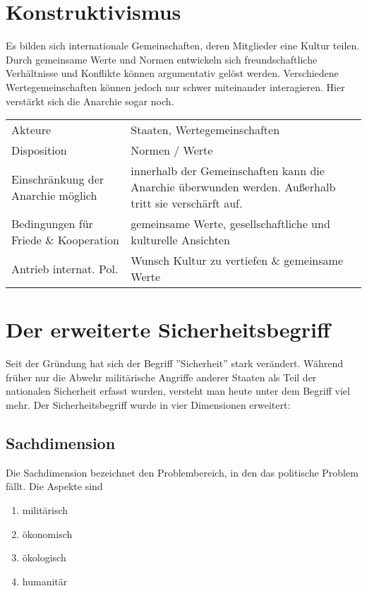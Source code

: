 \documentclass{article}
\begin{document}
\section*{Konstruktivismus}
Es bilden sich internationale Gemeinschaften, deren Mitglieder eine Kultur teilen. Durch gemeinsame Werte und Normen
entwickeln sich freundschaftliche Verhältnisse und Konflikte können argumentativ gelöst werden. Verschiedene
Wertegemeinschaften können jedoch nur schwer miteinander interagieren. Hier verstärkt sich die Anarchie sogar noch.
\begin{center}
\begin{tabular}{p{} p{}}
    Akteure                               & Staaten, Wertegemeinschaften                                    \\
    Disposition                           & Normen / Werte                                \\
    Einschränkung der Anarchie möglich    & innerhalb der Gemeinschaften kann die Anarchie überwunden werden. Außerhalb tritt sie verschärft auf. \\
    Bedingungen für Friede \& Kooperation & gemeinsame Werte, gesellschaftliche und kulturelle Ansichten                            \\
    Antrieb internat. Pol.                & Wunsch Kultur zu vertiefen \& gemeinsame Werte
\end{tabular}
\end{center}
\section*{Der erweiterte Sicherheitsbegriff}
Seit der Gründung hat sich der Begriff ''Sicherheit'' stark verändert. Während früher nur die Abwehr militärische Angriffe anderer Staaten
als Teil der nationalen Sicherheit erfasst wurden, versteht man heute unter dem Begriff viel mehr. Der Sicherheitsbegriff wurde in 
vier Dimensionen erweitert:
\subsection*{Sachdimension}
Die Sachdimension bezeichnet den Problembereich, in den das politische Problem fällt. Die Aspekte sind
\begin{enumerate}
    \item militärisch
    \item ökonomisch
    \item ökologisch
    \item humanitär
\end{enumerate}
\end{document}
